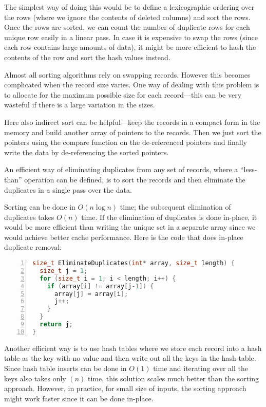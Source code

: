 The simplest way of doing this would be to define a lexicographic
ordering over the rows (where we ignore the contents of deleted
columns) and sort the rows.  Once the rows are sorted, we can count
the number of duplicate rows for each unique row easily in a linear
pass. In case it is expensive to swap the rows (since each row contains
large amounts of data), it might be more efficient to hash the contents
of the row and sort the hash values instead.

Almost all sorting algorithms rely on swapping records. However this
becomes complicated when the record size varies. One way of
dealing with this problem is to allocate for the maximum possible
size for each record---this can be very wasteful if there is a large
variation in the sizes. 

Here also indirect sort can be helpful---keep the records in a compact form in
the memory and build another array of pointers to the records. 
Then we just sort the pointers using 
the compare function on the de-referenced pointers 
and finally write the data by de-referencing the sorted pointers.


An efficient way of eliminating duplicates from any set of records,
where a ``less-than'' operation can be defined, is to sort the records
and then eliminate the duplicates in a single pass over the data.

Sorting can be done in $O(n\log n)$ time;  the subsequent elimination of
duplicates takes $O(n)$ time. If the elimination of duplicates is
done in-place, it would be more efficient than writing the unique set
in a separate array since we would achieve better cache performance.
Here is the code that does in-place duplicate removal:
\begin{lstlisting}[basicstyle=\footnotesize,numbers=left,breaklines=true,language=C++]
size_t EliminateDuplicates(int* array, size_t length) {
  size_t j = 1;
  for (size_t i = 1; i < length; i++) {
    if (array[i] != array[j-1]) {
      array[j] = array[i];
      j++;
    }
  }
  return j;
}
\end{lstlisting}

Another efficient way is to use hash tables where we
store each record into a hash table as the key with no value and
then write out all the keys in the hash table. Since hash table
inserts can be done in $O(1)$ time and iterating over all the keys also takes
only $(n)$ time, this solution scales much better than the sorting
approach. However, in practice, for small size of inputs, the sorting
approach might work faster since it can be done in-place.

